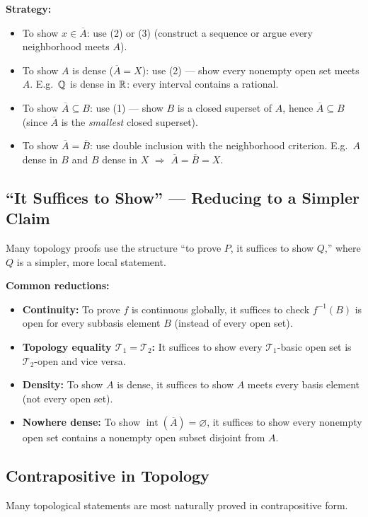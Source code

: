 \documentclass{article}
\begin{document}
\textbf{Strategy:}
\begin{itemize}
  \item To show $x \in \overline{A}$: use (2) or (3) (construct a
    sequence or argue every neighborhood meets $A$).
  \item To show $A$ is dense ($\overline{A} = X$): use (2) --- show
    every nonempty open set meets $A$. E.g.\ $\mathbb{Q}$ is dense in $\mathbb{R}$:
    every interval contains a rational.
  \item To show $\overline{A} \subseteq B$: use (1) --- show $B$ is a
    closed superset of $A$, hence $\overline{A} \subseteq B$ (since
    $\overline{A}$ is the \emph{smallest} closed superset).
  \item To show $\overline{A} = \overline{B}$: use double inclusion with
    the neighborhood criterion. E.g.\ $A$ dense in $B$ and $B$ dense in
    $X$ $\Rightarrow$ $\overline{A} = \overline{B} = X$.
\end{itemize}

\subsection{``It Suffices to Show'' --- Reducing to a Simpler Claim}
Many topology proofs use the structure ``to prove $P$, it suffices to
show $Q$,'' where $Q$ is a simpler, more local statement.

\textbf{Common reductions:}
\begin{itemize}
  \item \textbf{Continuity:} To prove $f$ is continuous globally, it
    suffices to check $f^{-1}(B)$ is open for every subbasis element $B$
    (instead of every open set).
  \item \textbf{Topology equality $\mathcal{T}_1 = \mathcal{T}_2$:} It
    suffices to show every $\mathcal{T}_1$-basic open set is
    $\mathcal{T}_2$-open and vice versa.
  \item \textbf{Density:} To show $A$ is dense, it suffices to show $A$
    meets every basis element (not every open set).
  \item \textbf{Nowhere dense:} To show $\operatorname{int}(\overline{A})
    = \varnothing$, it suffices to show every nonempty open set contains
    a nonempty open subset disjoint from $A$.
\end{itemize}

\subsection{Contrapositive in Topology}
Many topological statements are most naturally proved in contrapositive form.
\end{document}
